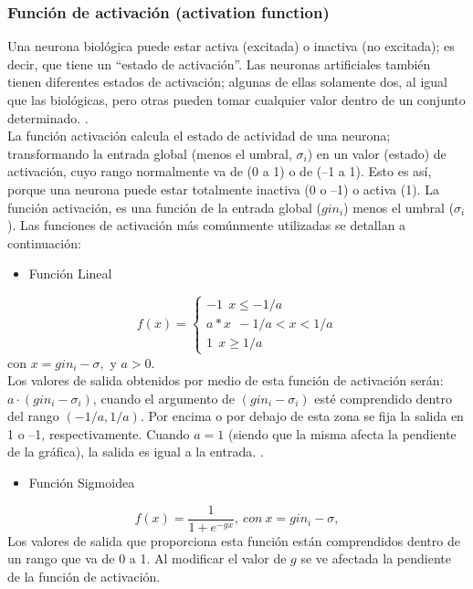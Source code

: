 \subsubsection{Función de activación (activation function)}
Una neurona biológica puede estar activa (excitada) o inactiva (no excitada); es decir, que tiene un “estado de activación”. Las neuronas artificiales también tienen diferentes estados de activación; algunas de ellas solamente dos, al igual que las biológicas, pero otras pueden tomar cualquier valor dentro de un conjunto determinado. \citep{matich2001redes}.\\
La función activación calcula el estado de actividad de una neurona; transformando la entrada global (menos el umbral, $\sigma_{i}$) en un valor (estado) de activación, cuyo rango normalmente va de (0 a 1) o de (–1 a 1). Esto es así, porque una neurona puede estar totalmente inactiva (0 o –1) o activa (1).
La función activación, es una función de la entrada global ($gin_{i}$) menos el umbral ($\sigma_{i}$). Las funciones de activación más comúnmente utilizadas se detallan a continuación:

\begin{itemize}
\item Función Lineal
\end{itemize}

\begin{equation}
f(x)=\left\lbrace 
\begin{array}{lll}
-1 \ \ x \leq -1 / a\\
a \ast x \ \ -1/a<x<1/a\\
1 \ \ x \geq 1/a
\end{array}
\end{equation}
con $x=gin_{i} -	\sigma, $ y $a >0.$\\
Los valores de salida obtenidos por medio de esta función de activación serán: $a\cdot(gin_{i} - \sigma_{i})$, cuando el argumento de $(gin_{i} - \sigma_{i})$ esté comprendido dentro del rango $(-1/a, 1/a)$. Por encima o por debajo de esta zona se fija la salida en 1 o –1, respectivamente.
Cuando $a = 1$ (siendo que la misma afecta la pendiente de la gráfica), la salida es igual a la entrada. \citep{matich2001redes}.

\begin{itemize}
    \item Función Sigmoidea
\end{itemize}

\begin{equation}
f(x)= \frac{1}{1+e^{-gx}}, \ con \ x=gin_{i}-\sigma,
\label{funcionSigmoidea}
\end{equation}
Los valores de salida que proporciona esta función están comprendidos dentro de un rango que va de 0 a 1. Al
modificar el valor de $g$ se ve afectada la pendiente de la función de activación. 

